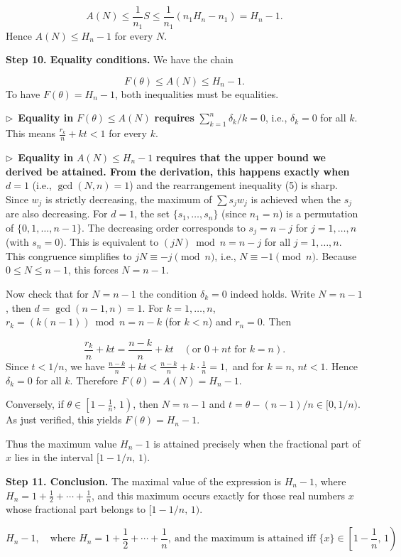 \documentclass{llmxive}
\providecommand{\compactbullet}[1]{\par\noindent$\triangleright$~#1\par}
\begin{document}
\[
A(N) \le \frac{1}{n_1} S \le \frac{1}{n_1}(n_1 H_n - n_1) = H_n - 1.
\]
Hence \(A(N) \le H_n - 1\) for every \(N\).\par
\textbf{Step 10. Equality conditions.} We have the chain\par
\[
F(\theta) \le A(N) \le H_n - 1.
\]
To have \(F(\theta) = H_n - 1\), both inequalities must be equalities.\par
\compactbullet{\textbf{Equality in }\(F(\theta) \le A(N)\)\textbf{ requires }\(\sum_{k=1}^{n} \delta_k/k = 0\), i.e., \(\delta_k = 0\) for all \(k\). This means \(\frac{r_k}{n} + kt < 1\) for every \(k\).}
\compactbullet{\textbf{Equality in }\(A(N) \le H_n - 1\)\textbf{ requires that the upper bound we derived be attained. From the derivation, this happens exactly when }\(d = 1\) (i.e., \(\gcd(N,n)=1\)) and the rearrangement inequality (5) is sharp. Since \(w_j\) is strictly decreasing, the maximum of \(\sum s_j w_j\) is achieved when the \(s_j\) are also decreasing. For \(d = 1\), the set \(\{s_1,\dots,s_n\}\) (since \(n_1=n\)) is a permutation of \(\{0,1,\dots,n-1\}\). The decreasing order corresponds to \(s_j = n - j\) for \(j=1,\dots,n\) (with \(s_n = 0\)). This is equivalent to \((j N) \bmod n = n - j\) for all \(j=1,\dots,n\). This congruence simplifies to \(j N \equiv -j \pmod{n}\), i.e., \(N \equiv -1 \pmod{n}\). Because \(0 \le N \le n-1\), this forces \(N = n-1\).}
Now check that for \(N = n-1\) the condition \(\delta_k = 0\) indeed holds. Write \(N = n-1\), then \(d = \gcd(n-1,n)=1\). For \(k=1,\dots,n\), \(r_k = (k(n-1)) \bmod n = n - k\) (for \(k<n\)) and \(r_n = 0\). Then\par
\[
\frac{r_k}{n} + kt = \frac{n - k}{n} + k t \quad (\text{or } 0 + n t \text{ for } k=n).
\]
Since \(t < 1/n\), we have \(\frac{n - k}{n} + k t < \frac{n - k}{n} + k \cdot \frac{1}{n} = 1,\) and for \(k=n\), \(n t < 1\). Hence \(\delta_k = 0\) for all \(k\). Therefore \(F(\theta) = A(N) = H_n - 1\).\par
Conversely, if \(\theta \in \left[1 - \frac1n,\, 1\right)\), then \(N = n-1\) and \(t = \theta - (n-1)/n \in [0,1/n)\). As just verified, this yields \(F(\theta) = H_n - 1\).\par
Thus the maximum value \(H_n - 1\) is attained precisely when the fractional part of \(x\) lies in the interval \([1 - 1/n,\, 1)\).\par
\textbf{Step 11. Conclusion.} The maximal value of the expression is \(H_n - 1\), where \(H_n = 1 + \frac12 + \cdots + \frac1n\), and this maximum occurs exactly for those real numbers \(x\) whose fractional part belongs to \([1 - 1/n,\, 1)\).\par
\[
\boxed{H_n - 1,\quad \text{where } H_n = 1 + \frac{1}{2} + \cdots + \frac{1}{n},\ \text{and the maximum is attained iff } \{x\} \in \left[1 - \frac{1}{n},\, 1\right)}
\]
\par
\end{document}
